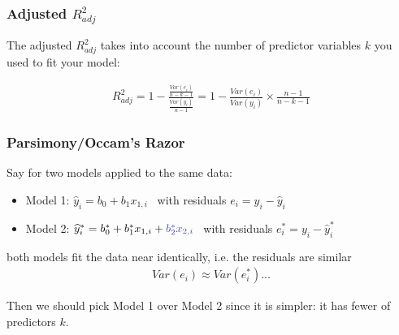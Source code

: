 \documentclass[handout]{beamer}
\newcommand{\blue}[1]{\textcolor{blue2}{#1}}
\begin{document}
\begin{frame}[fragile]
\frametitle{Adjusted $R^2_{adj}$}

%
%
The \blue{adjusted $R^2_{adj}$} takes into account the number of predictor variables $k$ you used to fit your model:  

\pause
\begin{eqnarray*}
R^2_{adj} = 1 - \frac{\frac{Var(e_i)}{n-k-1}}{\frac{Var(y_i)}{n-1}} = 1 - \frac{Var(e_i)}{Var(y_i)} \times \frac{n-1}{n-k-1}
\end{eqnarray*}

\end{frame}


%
%


\begin{frame}[fragile]
\frametitle{Parsimony/Occam's Razor}

%
%
Say for two models applied to the same data:
\begin{itemize}
\pause\item Model 1: $\widehat{y}_i = b_0 + b_1 x_{1,i}$ \ with residuals $e_i = y_i - \widehat{y}_i$
\pause\item Model 2: $\widehat{y}_i^* = b_0^* + b_1^* x_{1,i} + \blue{b_2^* x_{2,i}}$ \ with residuals $e_i^* = y_i - \widehat{y}_i^*$
\end{itemize}

\pause both models fit the data near identically, i.e. the residuals are similar
\begin{eqnarray*}
Var(e_i) \approx Var(e_i^{*}) \ldots
\end{eqnarray*}

\pause Then we should pick Model 1 over Model 2 since it is \blue{simpler}: it has fewer of predictors $k$.

\end{frame}
\end{document}
